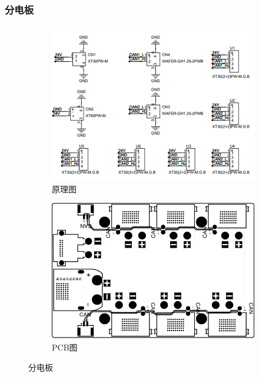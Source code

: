\documentclass{beamer}
\begin{document}
	

	


	
	\begin{frame}
		\frametitle{分电板}
			\begin{figure}[t]
			\centering
			\captionsetup{font=scriptsize} 
			\begin{subfigure}{0.45\textwidth}
				\centering
				\includegraphics[width=\linewidth]{img/chapter4/fendian}
				\caption{原理图}
			\end{subfigure}
			\hfill
			\begin{subfigure}{0.45\textwidth}
				\centering
				\includegraphics[width=\linewidth]{img/chapter4/fendianpcb}
				\caption{PCB图}
			\end{subfigure}
			
			\vspace{-5pt}
			\captionsetup{font=scriptsize} 
			\caption{分电板}
		\end{figure}
	\end{frame}
	
\end{document}
